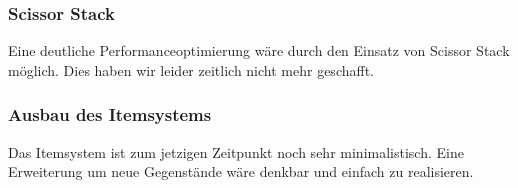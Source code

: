 \documentclass[10pt,a4paper,notitlepage]{scrreprt}
\begin{document}
		\subsubsection{Scissor Stack}
		Eine deutliche Performanceoptimierung wäre durch den Einsatz von Scissor Stack möglich. Dies haben wir leider zeitlich nicht mehr geschafft.
		
		\subsubsection{Ausbau des Itemsystems}
		Das Itemsystem ist zum jetzigen Zeitpunkt noch sehr minimalistisch. Eine Erweiterung um neue Gegenstände wäre denkbar und einfach zu realisieren.
			
\end{document}
